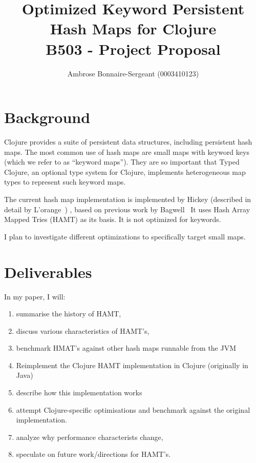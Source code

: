 \documentclass[10pt]{article}
\begin{document}
\title{Optimized Keyword Persistent Hash Maps for Clojure
\\
\large
B503 - Project Proposal}
\author{Ambrose Bonnaire-Sergeant (0003410123)}

\maketitle

\section*{Background}

Clojure provides a suite of persistent data structures,
including persistent hash maps.
The most common use of hash maps are small maps with keyword keys
(which we refer to as ``keyword maps'').
They are so important that Typed Clojure, an optional type
system for Clojure, implements heterogeneous map types
to represent such keyword maps.

The current hash map implementation is implemented by Hickey
(described in detail by L'orange~\cite{HyperionBlog1})
,
based on previous work by Bagwell~\cite{bagwell2001ideal}
It uses Hash Array Mapped Tries (HAMT) as its basis.
It is not optimized for keywords.

I plan to investigate different optimizations to specifically
target small maps.

\section*{Deliverables}

In my paper, I will:

\begin{enumerate}
\item summarise the history of HAMT,
\item discuss various characteristics of HAMT's,
\item benchmark HMAT's against other hash maps runnable from the JVM
\item Reimplement the Clojure HAMT implementation in Clojure (originally in Java)
\item describe how this implementation works
\item attempt Clojure-specific optimisations and benchmark against the original implementation.
\item analyze why performance characterists change,
\item speculate on future work/directions for HAMT's.
\end{enumerate}

\printbibliography
\end{document}
